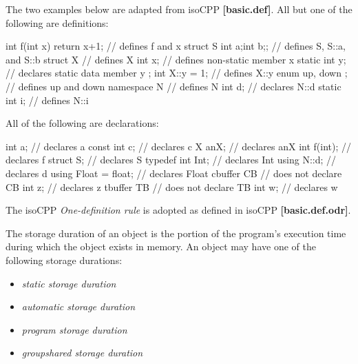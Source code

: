 \p The two examples below are adapted from \gls{isoCPP} \textbf{[basic.def]}. All
but one of the following are definitions:
\begin{HLSL}
int f(int x) { return x+1; } // defines f and x
struct S {int a;int b;};     // defines S, S::a, and S::b
struct X {                   // defines X
  int x;                     // defines non-static member x
  static int y;              // declares static data member y
};
int X::y = 1;                // defines X::y
enum { up, down };           // defines up and down
namespace N {                // defines N
int d;                       // declares N::d
static int i;                // defines N::i
}
\end{HLSL}

\p All of the following are declarations:
\begin{HLSL}
int a;                       // declares a
const int c;                 // declares c
X anX;                       // declares anX
int f(int);                  // declares f
struct S;                    // declares S
typedef int Int;             // declares Int
using N::d;                  // declares d
using Float = float;         // declares Float
cbuffer CB {                 // does not declare CB
  int z;                     // declares z
}
tbuffer TB {                 // does not declare TB
  int w;                     // declares w
}
\end{HLSL}


\p The \gls{isoCPP} \textit{One-definition rule} is adopted as defined in
\gls{isoCPP} \textbf{[basic.def.odr]}.




\p The storage duration of an object is the portion of the program's execution
time during which the object exists in memory. An object may have one of the
following storage durations:
\begin{itemize}
\item \textit{static storage duration}
\item \textit{automatic storage duration}
\item \textit{program storage duration}
\item \textit{groupshared storage duration}
\end{itemize}

